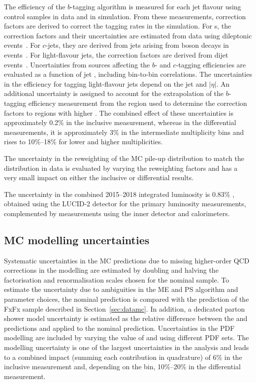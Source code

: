 \documentclass[cernpreprint, atlasdraft=false, texlive=2023, UKenglish, texmf, orcidlogo]{atlasdoc}
\begin{document}
The efficiency of the $b$-tagging algorithm is measured for each
jet flavour using control samples in data and in simulation. From
these measurements, correction factors are derived to correct the
tagging rates in the simulation. For \bjet{}s, the
correction factors and their uncertainties are estimated from data
using dileptonic \ttbar events~\cite{FTAG-2018-01,FTAG-2019-07}.
For $c$-jets, they are derived from jets arising from \Wboson boson decays
in \ttbar events~\cite{FTAG-2020-08}.
For light-flavour jets, the correction factors are derived from dijet
events~\cite{FTAG-2019-02}. Uncertainties from sources affecting
the $b$- and $c$-tagging efficiencies are evaluated as a function of
jet \pt, including bin-to-bin correlations. The uncertainties in the
efficiency for tagging light-flavour jets depend on the jet \pt and
$|\eta|$.  An additional uncertainty is assigned to account for the
extrapolation of the $b$-tagging efficiency measurement from the \pt
region used to determine the correction factors to regions with higher
\pt. The combined effect of these uncertainties is approximately 0.2\%
in the inclusive measurement, whereas in the differential measurements, it is
approximately 3\% in the intermediate \bjet multiplicity bins and
rises to 10\%--18\% for lower and higher \bjet multiplicities.
 
The uncertainty in the reweighting of the MC pile-up distribution to
match the distribution in data is evaluated by varying the reweighting
factors and has a very small impact on either the inclusive or
differential results.
 
The uncertainty in the combined 2015--2018 integrated luminosity is 0.83\% \cite{DAPR-2021-01},
obtained using the LUCID-2 detector \cite{LUCID2} for the primary luminosity measurements,
complemented by measurements using the inner detector and calorimeters.
 
 
\subsection{MC modelling uncertainties}\label{sec:systematics_theory}
 
Systematic uncertainties in the \ttW MC predictions due to missing
higher-order QCD corrections in the modelling are estimated by doubling and
halving the factorisation and renormalisation scales chosen for the nominal sample.
To estimate the uncertainty due to ambiguities in the ME and
PS algorithm and parameter choices, the nominal \Sherpa
prediction is compared with the prediction of the \MGPY[8] FxFx sample
described in Section~\ref{sec:datamc}. In addition, a dedicated parton
shower model uncertainty is estimated as the relative
difference between the \POWPY[8] and \POWHER[7] predictions and
applied to the nominal \ttW prediction. Uncertainties in the PDF
modelling are included by varying the value of \alphas and using
different PDF sets.  The \ttW modelling uncertainty is one of the largest
uncertainties in the analysis and leads to a combined impact (summing
each contribution in quadrature) of 6\% in the inclusive measurement and,
depending on the bin, 10\%--20\% in the differential measurement.
 
\end{document}
